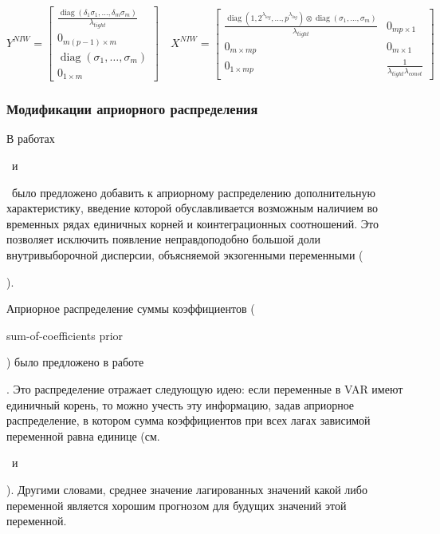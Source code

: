 \documentclass[11pt]{article} %
\DeclareMathOperator{\diag}{diag}
\newcommand{\eng}[1]{\begin{otherlanguage}{english}#1\end{otherlanguage}}
\begin{document}
\begin{equation}
Y^{NIW}=\begin{bmatrix}
\frac{\diag(\delta_1\sigma_1,\ldots, \delta_m\sigma_m)}{\lambda_{tight}}\\
0_{m(p-1)\times m}\\
\diag(\sigma_1,\ldots,\sigma_m)\\
0_{1\times m}
\end{bmatrix}
\quad
%
X^{NIW}=\begin{bmatrix}
\frac{\diag(1,2^{\lambda_{lag}},\ldots, p^{\lambda_{lag}})\otimes \diag(\sigma_1,\ldots,\sigma_m)}{\lambda_{tight}} & 0_{mp\times 1} \\
0_{m\times mp}&0_{m\times 1}\\
0_{1\times mp}&\frac{1}{\lambda_{tight}\lambda_{const}}
\end{bmatrix}\label{NIW_observations}
\end{equation}






\subsubsection*{Модификации априорного распределения}

В работах \eng{\cite{doan_al_1984}}~и \eng{\cite{sims_1993}}~было предложено добавить к априорному распределению дополнительную характеристику, введение которой обуславливается возможным наличием во временных рядах единичных корней и коинтеграционных  соотношений. Это позволяет исключить появление неправдоподобно большой доли внутривыборочной дисперсии, объясняемой экзогенными переменными (\eng{\cite{carriero_al_2015}}). %

Априорное распределение суммы коэффициентов (\eng{sum-of-coefficients prior}) было предложено в работе  \eng{\cite{doan_al_1984}}. Это распределение отражает следующую идею: если переменные в VAR имеют единичный корень, то можно учесть эту информацию, задав априорное распределение, в котором сумма коэффициентов при всех лагах зависимой переменной равна единице (см. \eng{\cite{robertson_tallman_1999}}~и \eng{\cite{blake_mumtaz_2012}}). Другими словами, среднее значение лагированных значений какой либо переменной является хорошим прогнозом  для будущих значений этой переменной.
\end{document}
